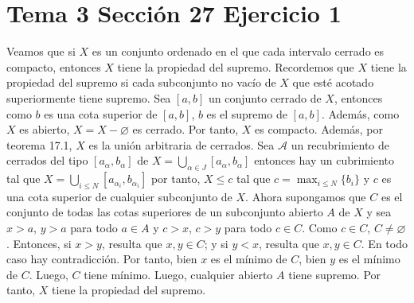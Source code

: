 \documentclass{article}
\begin{document}
\section{Tema 3 Sección 27 Ejercicio 1}
Veamos que si $X$ es un conjunto ordenado en el que cada intervalo cerrado es compacto, entonces $X$ tiene la propiedad del supremo. Recordemos que $X$ tiene la propiedad del supremo si cada subconjunto no vacío de $X$ que esté acotado superiormente tiene supremo.   Sea $[a,b]$ un conjunto cerrado de $X$, entonces como $b$ es una cota superior de $[a,b]$, $b$ es el supremo de $[a,b]$. Además, como $X$ es abierto, $X=X-\varnothing$ es cerrado. Por tanto, $X$ es compacto. Además, por teorema 17.1, $X$ es la unión arbitraria de cerrados. Sea $\mathcal{A}$ un recubrimiento de cerrados del tipo $[a_\alpha,b_\alpha]$ de $X=\bigcup_{\alpha\in J}[a_\alpha,b_\alpha]$ entonces hay un cubrimiento tal que $X=\bigcup_{i\leq N}[a_{\alpha_i},b_{\alpha_i}]$ por tanto, $X\leq c$ tal que $c=\max_{i\leq N}\{b_i\}$ y $c$ es una cota superior de cualquier subconjunto de $X$. Ahora supongamos que $C$ es el conjunto de todas las cotas superiores de un subconjunto abierto $A$ de $X$ y sea $x> a$, $y> a$ para todo $a\in A$ y $c>x$, $c>y$ para todo $c\in C$. Como $c\in C$, $C\neq \varnothing$. Entonces, si $x>y$, resulta que $x,y\in C$; y si $y<x$, resulta que $x,y\in C$. En todo caso hay contradicción. Por tanto, bien $x$ es el mínimo de  $C$, bien $y$ es el mínimo de $C$. Luego, $C$ tiene mínimo. Luego, cualquier abierto $A$ tiene supremo. Por tanto, $X$ tiene la propiedad del supremo.
\end{document}
